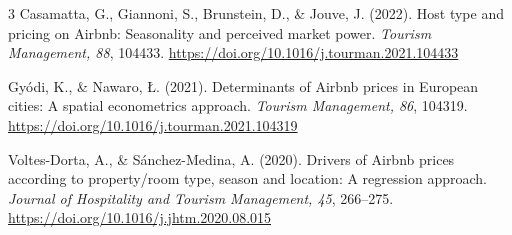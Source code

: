 \renewcommand{\refname}{Bibliography}
\begin{thebibliography}{3}
\setlength{\itemsep}{0.65\baselineskip}
Casamatta, G., Giannoni, S., Brunstein, D., \& Jouve, J. (2022).
Host type and pricing on Airbnb: Seasonality and perceived market power.
\textit{Tourism Management, 88}, 104433.
\url{https://doi.org/10.1016/j.tourman.2021.104433}

Gy\'{o}di, K., \& Nawaro, \L{}. (2021).
Determinants of Airbnb prices in European cities: A spatial econometrics approach.
\textit{Tourism Management, 86}, 104319.
\url{https://doi.org/10.1016/j.tourman.2021.104319}

Voltes-Dorta, A., \& S\'{a}nchez-Medina, A. (2020).
Drivers of Airbnb prices according to property/room type, season and location: A regression approach.
\textit{Journal of Hospitality and Tourism Management, 45}, 266--275.
\url{https://doi.org/10.1016/j.jhtm.2020.08.015}
\end{thebibliography}

